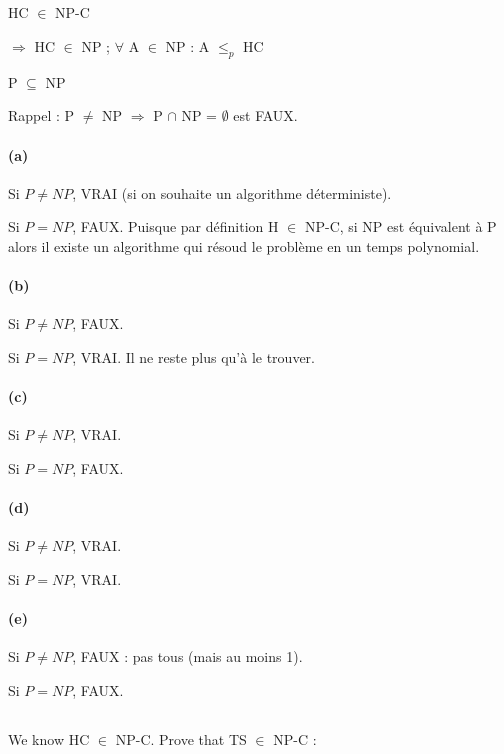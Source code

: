 \subsection{}

HC $\in$ NP-C

$\Rightarrow$ HC $\in$ NP ; $\forall$ A $\in$ NP : A $\leq_p$ HC

P $\subseteq$ NP

Rappel : P $\neq$ NP $\Rightarrow$ P $\cap$ NP = $\emptyset$ est FAUX.

\paragraph{(a)}

Si $P \neq NP$, VRAI (si on souhaite un algorithme déterministe).

Si $P = NP$, FAUX. Puisque par définition H $\in$ NP-C, si NP est
équivalent à P alors il existe un algorithme qui résoud le problème en
un temps polynomial.

\paragraph{(b)}
Si $P \neq NP$, FAUX.

Si $P = NP$, VRAI. Il ne reste plus qu'à le trouver.

\paragraph{(c)}
Si $P \neq NP$, VRAI.

Si $P = NP$, FAUX.
\paragraph{(d)}
Si $P \neq NP$, VRAI.

Si $P = NP$, VRAI.
\paragraph{(e)}

Si $P \neq NP$, FAUX : pas tous (mais au moins 1).

Si $P = NP$, FAUX.

\subsection{}

We know HC $\in$ NP-C. Prove that TS $\in$ NP-C :

